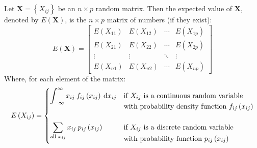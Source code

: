 \documentclass[a4paper]{article}
\newcommand{\highspace}{\vspace{1.2em}\noindent}
\begin{document}
    \highspace
    Let $\mathbf{X} = \left\{X_{ij}\right\}$ be an $n \times p$ random matrix. Then the expected value of $\mathbf{X}$, denoted by $E\left(\mathbf{X}\right)$, is the $n \times p$ matrix of numbers (if they exist):
    \begin{equation}\label{eq: random vectors and matrices}
        E\left(\mathbf{X}\right) = \begin{bmatrix}
            E\left(X_{11}\right) & E\left(X_{12}\right) & \cdots & E\left(X_{1p}\right) \\ 
            E\left(X_{21}\right) & E\left(X_{22}\right) & \cdots & E\left(X_{2p}\right) \\ 
            \vdots               & \vdots               & \ddots & \vdots               \\ 
            E\left(X_{n1}\right) & E\left(X_{n2}\right) & \cdots & E\left(X_{np}\right)
        \end{bmatrix}
    \end{equation}
    Where, for each element of the matrix:
    \begin{equation*}
        E\left(X_{ij}\right) = \begin{cases}
            \displaystyle \int_{-\infty}^{\infty} x_{ij} \: f_{ij}\left(x_{ij}\right) \:\mathrm{d}x_{ij} & \text{if }X_{ij}\text{ is a continuous random variable} \vspace{-.5em} \\
            & \text{with probability density function }f_{ij}\left(x_{ij}\right) \\
            \\
            \displaystyle \sum_{\text{all }x_{ij}} x_{ij} \: p_{ij} \left(x_{ij}\right) & \text{if }X_{ij}\text{ is a discrete random variable} \vspace{-.9em} \\
            & \text{with probability function }p_{ij}\left(x_{ij}\right)
        \end{cases}
    \end{equation*}
\end{document}
